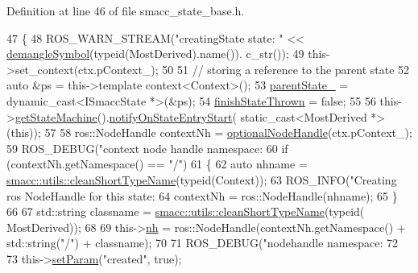 Definition at line 46 of file smacc\+\_\+state\+\_\+base.\+h.


\begin{DoxyCode}
47   \{
48     ROS\_WARN\_STREAM(\textcolor{stringliteral}{"creatingState state: "} << \hyperlink{namespacesmacc_1_1introspection_a2f495108db3e57604d8d3ff5ef030302}{demangleSymbol}(\textcolor{keyword}{typeid}(MostDerived).name()).
      c\_str());
49     this->set\_context(ctx.pContext\_);
50 
51     \textcolor{comment}{// storing a reference to the parent state}
52     \textcolor{keyword}{auto} &ps = this->\textcolor{keyword}{template} context<Context>();
53     \hyperlink{classsmacc_1_1ISmaccState_ad61db41d8d06a836e7d1dac7767f5695}{parentState\_} = \textcolor{keyword}{dynamic\_cast<}ISmaccState *\textcolor{keyword}{>}(&ps);
54     \hyperlink{classsmacc_1_1SmaccState_a6c40f733c35ddfb9ae2a2f8e9bab07d3}{finishStateThrown} = \textcolor{keyword}{false};
55 
56     this->\hyperlink{classsmacc_1_1SmaccState_afc39f8e0ca4001b2159a100da2fccd0e}{getStateMachine}().\hyperlink{classsmacc_1_1ISmaccStateMachine_aeec54e997d715b105ebfeb5caadc4fbf}{notifyOnStateEntryStart}(
      static\_cast<MostDerived *>(\textcolor{keyword}{this}));
57 
58     ros::NodeHandle contextNh = \hyperlink{namespacesmacc_1_1introspection_a8acc3b4146a8b2bb0a9fa4178840e9b9}{optionalNodeHandle}(ctx.pContext\_);
59     ROS\_DEBUG(\textcolor{stringliteral}{"context node handle namespace: %
60     \textcolor{keywordflow}{if} (contextNh.getNamespace() == \textcolor{stringliteral}{"/"})
61     \{
62       \textcolor{keyword}{auto} nhname = \hyperlink{namespacesmacc_1_1utils_aacd1975bb7cd9bec4b50e111a2ae7edb}{smacc::utils::cleanShortTypeName}(\textcolor{keyword}{typeid}(Context));
63       ROS\_INFO(\textcolor{stringliteral}{"Creating ros NodeHandle for this state: %
64       contextNh = ros::NodeHandle(nhname);
65     \}
66 
67     std::string classname = \hyperlink{namespacesmacc_1_1utils_aacd1975bb7cd9bec4b50e111a2ae7edb}{smacc::utils::cleanShortTypeName}(\textcolor{keyword}{typeid}(
      MostDerived));
68 
69     this->\hyperlink{classsmacc_1_1ISmaccState_a13fe6e6abfdb87996402189d44b78494}{nh} = ros::NodeHandle(contextNh.getNamespace() + std::string(\textcolor{stringliteral}{"/"}) + classname);
70 
71     ROS\_DEBUG(\textcolor{stringliteral}{"nodehandle namespace: %
72 
73     this->\hyperlink{classsmacc_1_1ISmaccState_a0b6c531ca8c446052022308548f55b92}{setParam}(\textcolor{stringliteral}{"created"}, \textcolor{keyword}{true});
}}}
\end{DoxyCode}
